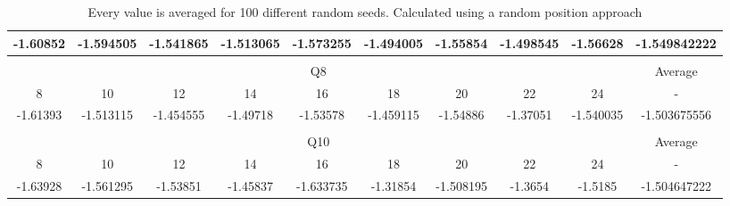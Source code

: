 \documentclass[10pt,a4paper]{article}
\begin{document}
\begin{table}[h]
\begin{adjustbox}{width=1\textwidth}
\begin{tabular}{cccccccccc}
\multicolumn{1}{|c|}{-1.60852} & \multicolumn{1}{c|}{-1.594505} & \multicolumn{1}{c|}{-1.541865} & \multicolumn{1}{c|}{-1.513065} & \multicolumn{1}{c|}{-1.573255} & \multicolumn{1}{c|}{-1.494005} & \multicolumn{1}{c|}{-1.55854} & \multicolumn{1}{c|}{-1.498545} & \multicolumn{1}{c|}{-1.56628} & \multicolumn{1}{c|}{-1.549842222} \\ \hline
\multicolumn{1}{l}{} & \multicolumn{1}{l}{} & \multicolumn{1}{l}{} & \multicolumn{1}{l}{} & \multicolumn{1}{l}{} & \multicolumn{1}{l}{} & \multicolumn{1}{l}{} & \multicolumn{1}{l}{} & \multicolumn{1}{l}{} & \multicolumn{1}{l}{} \\ \hline
\multicolumn{9}{|c|}{Q8} & \multicolumn{1}{c|}{Average} \\ \hline
\multicolumn{1}{|c|}{8} & \multicolumn{1}{c|}{10} & \multicolumn{1}{c|}{12} & \multicolumn{1}{c|}{14} & \multicolumn{1}{c|}{16} & \multicolumn{1}{c|}{18} & \multicolumn{1}{c|}{20} & \multicolumn{1}{c|}{22} & \multicolumn{1}{c|}{24} & \multicolumn{1}{c|}{-} \\ \hline
\multicolumn{1}{|c|}{-1.61393} & \multicolumn{1}{c|}{-1.513115} & \multicolumn{1}{c|}{-1.454555} & \multicolumn{1}{c|}{-1.49718} & \multicolumn{1}{c|}{-1.53578} & \multicolumn{1}{c|}{-1.459115} & \multicolumn{1}{c|}{-1.54886} & \multicolumn{1}{c|}{-1.37051} & \multicolumn{1}{c|}{-1.540035} & \multicolumn{1}{c|}{-1.503675556} \\ \hline
\multicolumn{1}{l}{} & \multicolumn{1}{l}{} & \multicolumn{1}{l}{} & \multicolumn{1}{l}{} & \multicolumn{1}{l}{} & \multicolumn{1}{l}{} & \multicolumn{1}{l}{} & \multicolumn{1}{l}{} & \multicolumn{1}{l}{} & \multicolumn{1}{l}{} \\ \hline
\multicolumn{9}{|c|}{Q10} & \multicolumn{1}{c|}{Average} \\ \hline
\multicolumn{1}{|c|}{8} & \multicolumn{1}{c|}{10} & \multicolumn{1}{c|}{12} & \multicolumn{1}{c|}{14} & \multicolumn{1}{c|}{16} & \multicolumn{1}{c|}{18} & \multicolumn{1}{c|}{20} & \multicolumn{1}{c|}{22} & \multicolumn{1}{c|}{24} & \multicolumn{1}{c|}{-} \\ \hline
\multicolumn{1}{|c|}{-1.63928} & \multicolumn{1}{c|}{-1.561295} & \multicolumn{1}{c|}{-1.53851} & \multicolumn{1}{c|}{-1.45837} & \multicolumn{1}{c|}{-1.633735} & \multicolumn{1}{c|}{-1.31854} & \multicolumn{1}{c|}{-1.508195} & \multicolumn{1}{c|}{-1.3654} & \multicolumn{1}{c|}{-1.5185} & \multicolumn{1}{c|}{-1.504647222} \\ \hline
\end{tabular}
\end{adjustbox}
\caption{Every value is averaged for 100 different random seeds. Calculated using a random position approach}
\end{table}
\end{document}
